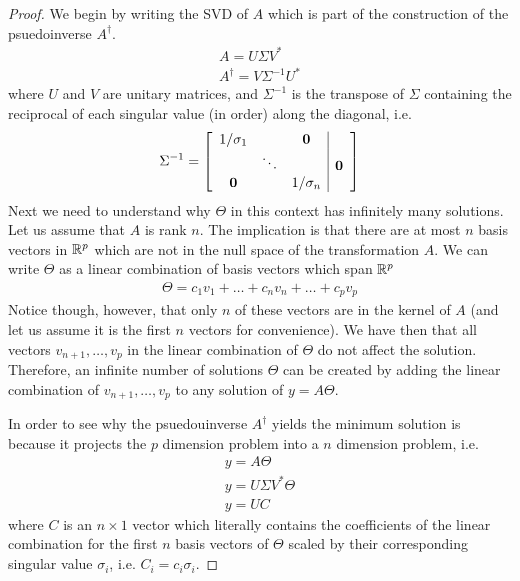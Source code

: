 \documentclass{article}
\begin{document}
\begin{proof}
    We begin by writing the SVD of $A$ which is part of the construction of the
    psuedoinverse $A^{\dagger}$. 
    \begin{gather*}
        A = U\Sigma V^*\\
        A^{\dagger} = V\Sigma^{-1}U^*
    \end{gather*}
    where $U$ and $V$ are unitary matrices, and $\Sigma^{-1}$ is the transpose of $\Sigma$ containing the reciprocal
    of each singular value (in order) along the diagonal, i.e. 
    \begin{gather*}
        \Sigma^{-1} = \left[\begin{array}{c c c | c}
                            1/\sigma_1 & & \boldsymbol{0} & \\
                             &\ddots & & \boldsymbol{0}\\
                            \boldsymbol{0} & & 1/\sigma_n &
                            \end{array}\right]
    \end{gather*}
    Next we need to understand why $\Theta$ in this context has infinitely many
    solutions. Let us assume that $A$ is rank $n$. The implication is that there
    are at most $n$ basis vectors in $\mathbb{R}^{p}$ which are not in the null space of
    the transformation $A$. We can write $\Theta$ as a linear combination
    of basis vectors which span $\mathbb{R}^{p}$
    \begin{gather*}
        \Theta = c_1v_1 + \ldots + c_nv_n + \ldots + c_pv_p
    \end{gather*}
    Notice though, however, that only $n$ of these vectors are in the kernel of
    $A$ (and let us assume it is the first $n$ vectors for convenience). We have
    then that all vectors $v_{n+1}, \ldots, v_{p}$ in the linear combination of
    $\Theta$ do not affect the solution. Therefore, an infinite number of
    solutions $\Theta$ can be created by adding the linear combination of
    $v_{n+1}, \ldots, v_p$ to any solution of $y = A\Theta$. 


    In order to see why the psuedouinverse $A^{\dagger}$ yields the minimum
    solution is because it projects the $p$ dimension problem into a $n$
    dimension problem, i.e.
    \begin{gather*}
        y = A\Theta \\
        y = U\Sigma V^*\Theta\\
        y = UC
    \end{gather*}
    where $C$ is an $n\times1$ vector which literally contains the coefficients
    of the linear combination for the first $n$ basis vectors of $\Theta$ scaled
    by their corresponding singular value $\sigma_i$, i.e. $C_i = c_i\sigma_i$. 


\end{proof}
\end{document}

